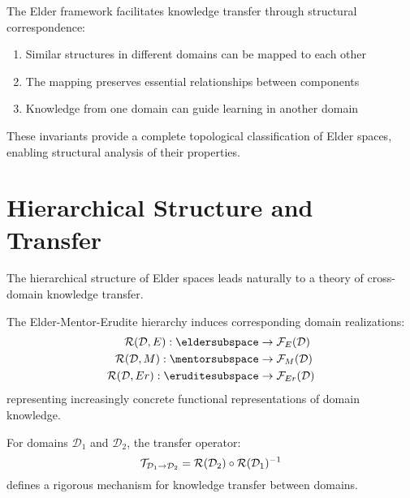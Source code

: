 \begin{theorem}
The Elder framework facilitates knowledge transfer through structural correspondence:
\begin{enumerate}
    \item Similar structures in different domains can be mapped to each other
    \item The mapping preserves essential relationships between components
    \item Knowledge from one domain can guide learning in another domain
\end{enumerate}
\end{theorem}

These invariants provide a complete topological classification of Elder spaces, enabling structural analysis of their properties.

\section{Hierarchical Structure and Transfer}

The hierarchical structure of Elder spaces leads naturally to a theory of cross-domain knowledge transfer.

\begin{theorem}
The Elder-Mentor-Erudite hierarchy induces corresponding domain realizations:
\begin{align}
\realization{\mathcal{D},E}: \eldersubspace &\rightarrow \mathcal{F}_E(\mathcal{D}) \\
\realization{\mathcal{D},M}: \mentorsubspace &\rightarrow \mathcal{F}_M(\mathcal{D}) \\
\realization{\mathcal{D},Er}: \eruditesubspace &\rightarrow \mathcal{F}_{Er}(\mathcal{D})
\end{align}
representing increasingly concrete functional representations of domain knowledge.
\end{theorem}

\begin{corollary}
For domains $\mathcal{D}_1$ and $\mathcal{D}_2$, the transfer operator:
\begin{equation}
\mathcal{T}_{\mathcal{D}_1 \rightarrow \mathcal{D}_2} = \mathcal{R}(\mathcal{D}_2) \circ \mathcal{R}(\mathcal{D}_1)^{-1}
\end{equation}
defines a rigorous mechanism for knowledge transfer between domains.
\end{corollary}

